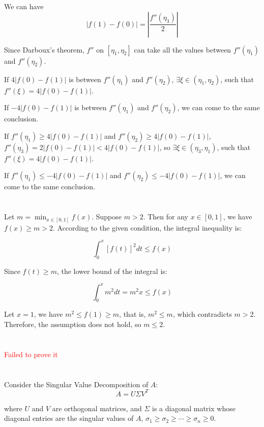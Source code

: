 \documentclass{article}
\begin{document}
We can have
$$
|f(1)-f(0)|=|\frac{f''(\eta_3)}{2} |
$$

Since Darboux's theorem, $f''$ on $[\eta_1,\eta_2]$ can take all the values between $f''(\eta_1)$ and $f''(\eta_2)$.

If $4|f(0)-f(1)|$ is between $f''(\eta_1)$ and $f''(\eta_2)$, $\exists \xi \in (\eta_1,\eta_2)$, such that $f''(\xi )=4|f(0)-f(1)|$.

If  $-4|f(0)-f(1)|$ is between $f''(\eta_1)$ and $f''(\eta_2)$, we can come to the same conclusion.

If $f''(\eta_1) \geq 4|f(0)-f(1)|$ and $f''(\eta_2) \geq 4|f(0)-f(1)|$, $f''(\eta_3)=2|f(0)-f(1)| < 4|f(0)-f(1)|$, so $\exists \xi \in (\eta_3,\eta_1)$, such that $f''(\xi )=4|f(0)-f(1)|$.

If $f''(\eta_1) \leq -4|f(0)-f(1)|$ and $f''(\eta_2) \leq -4|f(0)-f(1)|$, we can come to the same conclusion.

\section{}

Let $ m = \min_{x \in [0,1]} f(x) $. Suppose $ m > 2 $. Then for any $ x \in [0,1] $, we have $ f(x) \geq m > 2 $. According to the given condition, the integral inequality is:

$$\int_{0}^{x} [f(t)]^2 dt \leq f(x)$$

Since $ f(t) \geq m $, the lower bound of the integral is:

$$\int_{0}^{x} m^2 dt = m^2 x \leq f(x)$$

Let $ x = 1 $, we have $ m^2 \leq f(1) \geq m $, that is, $ m^2 \leq m $, which contradicts $ m > 2 $. Therefore, the assumption does not hold, so $ m \leq 2 $.


\section{}

\textcolor{red}{Failed to prove it}

\section{}

Consider the Singular Value Decomposition of $ A $:
$$
A = U\Sigma V^T
$$

where $ U $ and $ V $ are orthogonal matrices, and $ \Sigma $ is a diagonal matrix whose diagonal entries are the singular values of $ A $, $ \sigma_1 \geq \sigma_2 \geq \cdots \geq \sigma_n \geq 0 $.
\end{document}
